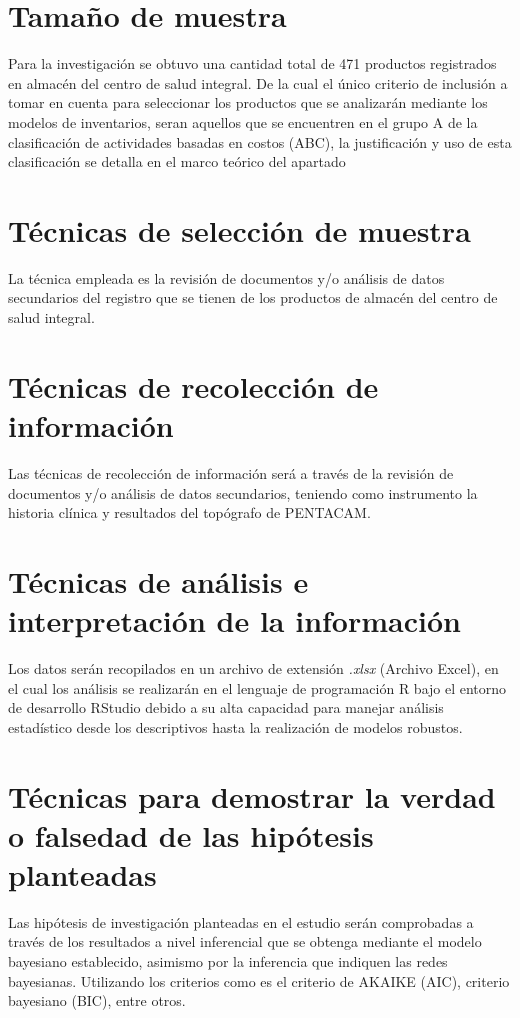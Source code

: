 \section{Tamaño de muestra}
Para la investigación se obtuvo una cantidad total de 471 productos registrados en almacén del centro de salud integral. De la cual el único criterio de inclusión a tomar en cuenta para seleccionar los productos que se analizarán mediante los modelos de inventarios, seran aquellos que se encuentren en el grupo A de la clasificación de actividades basadas en costos (ABC), la justificación y uso de esta clasificación se detalla en el marco teórico del apartado

\section{Técnicas de selección de muestra}
La técnica empleada es la revisión de documentos y/o análisis de datos secundarios del registro que se tienen de los productos de almacén del centro de salud integral.

\section{Técnicas de recolección de información}
Las técnicas de recolección de información será a través de la revisión de documentos y/o análisis de datos secundarios, teniendo como instrumento la historia clínica y resultados del topógrafo de PENTACAM.

\section{Técnicas de análisis e interpretación de la información}

Los datos serán recopilados en un archivo de extensión \textsl{.xlsx} (Archivo Excel), en el cual los análisis se realizarán en el lenguaje de programación R bajo el entorno de desarrollo RStudio debido a su alta capacidad para manejar análisis estadístico desde los descriptivos hasta la realización de modelos robustos.

\section{Técnicas para demostrar la verdad o falsedad de las hipótesis planteadas}

Las hipótesis de investigación planteadas en el estudio serán comprobadas a través de los resultados a nivel inferencial que se obtenga mediante el modelo bayesiano establecido, asimismo por la inferencia que indiquen las redes bayesianas. Utilizando los criterios como es el criterio de AKAIKE (AIC), criterio bayesiano (BIC), entre otros.